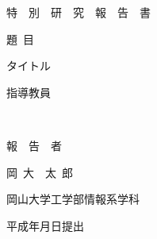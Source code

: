 \setlength{\textwidth}{377pt}
\setlength{\oddsidemargin}{37pt}
\setlength{\evensidemargin}{37pt}
\pagestyle{empty}

\begin{titlepage}

\vspace*{1cm}

\begin{center}


特\ \ 別\ \ 研\ \ 究\ \ 報\ \ 告\ \ 書

\vspace*{0.8cm}

題\ 目

\vspace*{1cm}

{\large{タイトル}}

\vspace*{-0.3cm}

\underline{\hspace*{12cm}}

\vspace*{3cm}

指導教員

\vspace*{0.3cm}

{\large{~}}

\vspace*{-0.3cm}

\underline{\hspace*{4cm}}

\vspace*{3cm}

報~~告~~者

\vspace*{0.3cm}

{\large{岡~大~~太~郎}}

\vspace*{-0.3cm}

\underline{\hspace*{4cm}}

\vspace*{0.5cm}

岡山大学工学部情報系学科

\vspace*{2cm}

平成年月日提出





\end{center}
\end{titlepage}
\newpage
